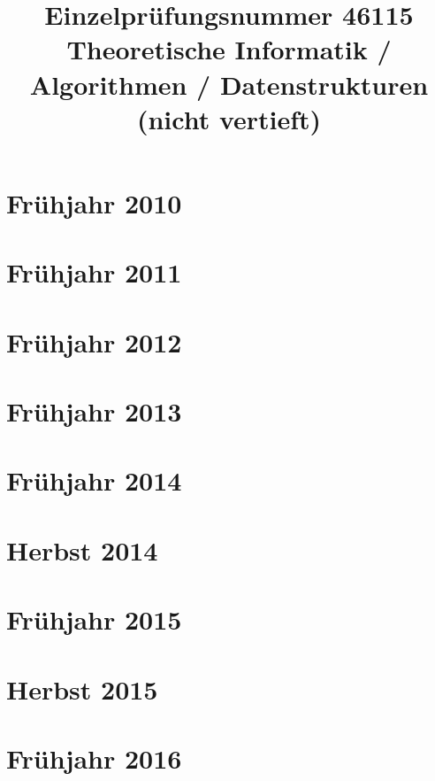 \documentclass{lehramt-informatik-examen-sammlung}
\title{Einzelprüfungsnummer 46115\\Theoretische Informatik / Algorithmen / Datenstrukturen (nicht vertieft)}
\begin{document}
\maketitle
\tableofcontents

\section{Frühjahr 2010}


\section{Frühjahr 2011}


\section{Frühjahr 2012}


\section{Frühjahr 2013}


\section{Frühjahr 2014}


\section{Herbst 2014}


\section{Frühjahr 2015}


\section{Herbst 2015}


\section{Frühjahr 2016}

\end{document}
